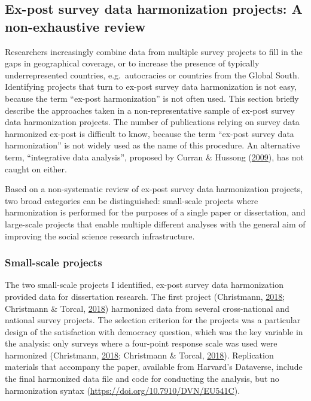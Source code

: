 \documentclass[12pt,]{article}
\begin{document}
\hypertarget{ex-post-survey-data-harmonization-projects-a-non-exhaustive-review}{%
\subsection{Ex-post survey data harmonization projects: A non-exhaustive review}\label{ex-post-survey-data-harmonization-projects-a-non-exhaustive-review}}

Researchers increasingly combine data from multiple survey projects to fill in the gaps in geographical coverage, or to increase the presence of typically underrepresented countries, e.g.~autocracies or countries from the Global South. Identifying projects that turn to ex-post survey data harmonization is not easy, because the term ``ex-post harmonization'' is not often used. This section briefly describe the approaches taken in a non-representative sample of ex-post survey data harmonization projects. The number of publications relying on survey data harmonized ex-post is difficult to know, because the term ``ex-post survey data harmonization'' is not widely used as the name of this procedure. An alternative term, ``integrative data analysis'', proposed by Curran \& Hussong (\protect\hyperlink{ref-Curran2009}{2009}), has not caught on either.

Based on a non-systematic review of ex-post survey data harmonization projects, two broad categories can be distinguished: small-scale projects where harmonization is performed for the purposes of a single paper or dissertation, and large-scale projects that enable multiple different analyses with the general aim of improving the social science research infrastructure.

\hypertarget{small-scale-projects}{%
\subsubsection{Small-scale projects}\label{small-scale-projects}}

The two small-scale projects I identified, ex-post survey data harmonization provided data for dissertation research. The first project (Christmann, \protect\hyperlink{ref-Christmann2018}{2018}; Christmann \& Torcal, \protect\hyperlink{ref-Christmann2018a}{2018}) harmonized data from several cross-national and national survey projects. The selection criterion for the projects was a particular design of the satisfaction with democracy question, which was the key variable in the analysis: only surveys where a four-point response scale was used were harmonized (Christmann, \protect\hyperlink{ref-Christmann2018}{2018}; Christmann \& Torcal, \protect\hyperlink{ref-Christmann2018a}{2018}). Replication materials that accompany the paper, available from Harvard's Dataverse, include the final harmonized data file and code for conducting the analysis, but no harmonization syntax (\url{https://doi.org/10.7910/DVN/EU541C}).
\end{document}
